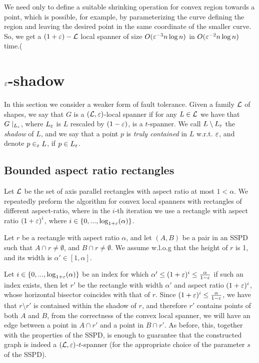 \documentclass[12pt]{article}%
\begin{document}
We need only to define a suitable shrinking operation for convex
region towards a point, which is possible, for example, by
parameterizing the curve defining the region and leaving the desired
point in the same coordinate of the smaller curve. So, we get a
$(1+\varepsilon)-\mathcal{L}$ local spanner of size $O(\varepsilon^{-3}n\log n)$ in
$O(\varepsilon^{-2}n\log n)$ time.(



	\section{$\varepsilon$-shadow}
In this section we consider a weaker form of fault tolerance. Given a family $\mathcal{L}$ of shapes, we say that $G$ is a $(\mathcal{L},\varepsilon)$-local spanner if for any $L\in\mathcal{L}$ we have that $G\mid_{L_{\varepsilon}}$, where $L_{\varepsilon}$ is $L$ rescaled by $(1-\varepsilon)$, is a $t$-spanner. We call $L\setminus L_{\varepsilon}$ the \emph{shadow} of $L$, and we say that a point $p$ is \emph{truly contained} in $L$ w.r.t. $\varepsilon$, and denote $p\in_{\varepsilon} L$, if $p\in L_{\varepsilon}$. 

\subsection{Bounded aspect ratio rectangles}
Let $\mathcal{L}$ be the set of axis parallel rectangles with aspect ratio at most $1<\alpha$. We repeatedly preform the algorithm for convex local spanners with rectangles of different aspect-ratio, where in the $i$-th iteration we use a rectangle with aspect ratio $\left(1+\varepsilon\right)^i$, where $i\in\{0,...,\log_{1+\varepsilon}(\alpha)\}$. 

Let $r$ be a rectangle with aspect ratio $\alpha$, and let $(A,B)$ be a pair in an SSPD such that $A\cap r\neq \emptyset$, and $B\cap r\neq \emptyset$. We assume w.l.o.g that the height of $r$ is 1, and its width is $\alpha'\in [1,\alpha]$.

Let $i\in \{0,...,\log_{1+\varepsilon}(\alpha)\}$ be an index for which $\alpha' \leq (1+\varepsilon)^i \leq \frac{\alpha}{1-\varepsilon}$ if such an index exists, then let $r'$ be the rectangle with width $\alpha'$ and aspect ratio $(1+\varepsilon)^i$, whose horizontal bisector coincides with that of $r$. Since $(1+\varepsilon)^i \leq \frac{\alpha}{1-\varepsilon}$, we have that $r\setminus r'$ is contained within the shadow of $r$, and therefore $r'$ contains points of both $A$ and $B$, from the correctness of the convex local spanner, we will have an edge between a point in $A\cap r'$ and a point in $B\cap r'$. As before, this, together with the properties of the SSPD, is enough to guarantee that the constructed graph is indeed a $(\mathcal{L}, \varepsilon)$-$t$-spanner (for the appropriate choice of the parameter $s$ of the SSPD).
\end{document}
